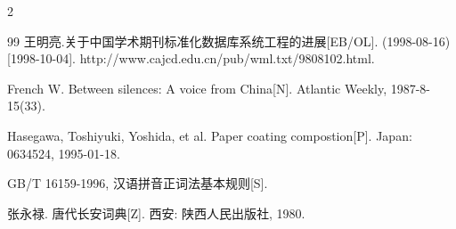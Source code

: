 \documentclass{ctacn}%
\begin{document}
\begin{multicols}{2}
\begin{thebibliography}{99}
王明亮.关于中国学术期刊标准化数据库系统工程的进展[EB/OL]. (1998-08-16)[1998-10-04]. http://www.cajcd.edu.cn/pub/wml.txt/9808102.html.

French W. Between silences: A voice from China[N]. Atlantic Weekly, 1987-8-15(33).

Hasegawa, Toshiyuki, Yoshida, et al. Paper coating compostion[P]. Japan: 0634524, 1995-01-18.

GB/T 16159-1996, 汉语拼音正词法基本规则[S].

张永禄. 唐代长安词典[Z]. 西安: 陕西人民出版社, 1980.

\end{thebibliography}\vspace{-1pt}

\begin{authorinfo}%
	\vspace{3pt}
	
	
	

\end{authorinfo}


\end{multicols}
\end{document}
